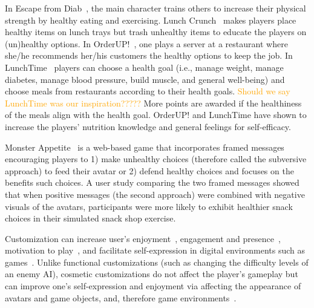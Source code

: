 In Escape from Diab~\cite{thompson2008serious}, the main character trains others to increase their physical strength by healthy eating and exercising. Lunch Crunch~\cite{lunchcrunch} makes players place healthy items on lunch trays but trash unhealthy items to educate the players on (un)healthy options. In OrderUP!~\cite{grimes2010let}, one plays a server at a restaurant where she/he recommends her/his customers the healthy options to keep the job. In LunchTime~\cite{orji2013lunchtime} players can choose a health goal (i.e., manage weight, manage diabetes, manage blood pressure, build muscle, and general well-being) and choose meals from restaurants according to their health goals. \textcolor{orange}{Should we say LunchTime was our inspiration?????} More points are awarded if the healthiness of the meals align with the health goal. OrderUP! and LunchTime have shown to increase the players' nutrition knowledge and general feelings for self-efficacy. 

Monster Appetite~\cite{hwang2017monster} is a web-based game that incorporates framed messages encouraging players to 1) make unhealthy choices (therefore called the subversive approach) to feed their avatar or 2) defend healthy choices and focuses on the benefits such choices. A user study comparing the two framed messages showed that when positive messages (the second approach) were combined with negative visuals of the avatars, participants were more likely to exhibit healthier snack choices in their simulated snack shop exercise. 


Customization can increase user's enjoyment~\cite{birk2016fostering,marathe2011drives,trepte2010avatar,turkay2015effects}, engagement and presence~\cite{ng2013examining}, motivation to play~\cite{turkay2015effects}, and facilitate self-expression in digital environments such as games~\cite{adinolf2011controlling,bailey2009avatar}. Unlike functional customizations (such as changing the difficulty levels of an enemy AI), cosmetic customizations do not affect the player's gameplay but can improve one's self-expression and enjoyment via affecting the appearance of avatars and game objects, and, therefore game environments~\cite{cuthbert2019effects,turkay2014effects}.  


